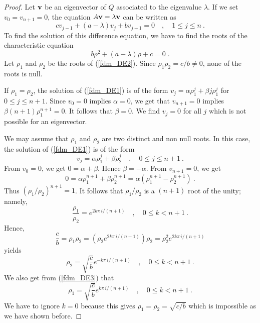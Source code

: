 \begin{proof}
Let $\mathbf{v}$ be an eigenvector of $Q$ associated to the eigenvalue
$\lambda$.  If we set $v_0 = v_{n+1} = 0$, the equation
$A\mathbf{v} = \lambda \mathbf{v}$ can be written as
\begin{equation} \label{fdm_DE1}
c v_{j-1} + (a-\lambda) v_j + b v_{j+1} = 0 \quad ,
\quad 1 \leq j \leq n \ .
\end{equation}
To find the solution of this difference equation, we have to find the
roots of the characteristic equation
\begin{equation} \label{fdm_DE2}
b \rho^2 + (a-\lambda) \rho + c = 0 \; .
\end{equation}
Let $\rho_1$ and $\rho_2$ be the roots of (\ref{fdm_DE2}).
Since $\rho_1\rho_2 = c/b \neq 0$, none of the roots is null.

If $\rho_1 = \rho_2$, the solution of (\ref{fdm_DE1}) is of the form 
$\displaystyle v_j = \alpha \rho_1^j + \beta j \rho_1^j$ for
$0 \leq j \leq n+1$. Since $v_0 = 0$ implies $\alpha=0$, we get that
$v_{n+1} = 0$ implies $\beta (n+1) \rho_1^{n+1} = 0$.  It follows that
$\beta=0$.  We find $v_j=0$ for all $j$ which is not possible for an
eigenvector.

We may assume that $\rho_1$ and $\rho_2$ are two distinct and non null
roots.  In this case, the solution of (\ref{fdm_DE1}) is of the form
\begin{equation} \label{fdm_DE4}
v_j = \alpha \rho_1^j + \beta \rho_2^j \quad , \quad 0 \leq j \leq n+1 \ . 
\end{equation}
From $v_0=0$, we get $0=\alpha+\beta$.  Hence $\beta=-\alpha$.  From
$v_{n+1} = 0$, we get
\[
0 = \alpha \rho_1^{n+1} + \beta \rho_2^{n+1}
= \alpha \left( \rho_1^{n+1} -\rho_2^{n+1}\right) \ .
\]
Thus $\displaystyle \left(\rho_1/\rho_2\right)^{n+1} = 1$.
It follows that $\rho_1/\rho_2$ is a $(n+1)$ root of the unity;
namely,
\begin{equation} \label{fdm_DE3}
\frac{\rho_1}{\rho_2} = e^{2k\pi\,i/(n+1)} \quad ,
\quad 0 \leq k < n+1 \ .
\end{equation}
Hence,
\[
\frac{c}{b} = \rho_1\rho_2 = \left(\rho_2 e^{2k\pi\,i/(n+1)}\right)
\rho_2 = \rho_2^2 e^{2k\pi\,i/(n+1)}
\]
yields
\[
\rho_2 =  \sqrt{\frac{c}{b}} e^{-k\pi\,i/(n+1)} \quad ,
\quad 0 \leq k < n+1 \ .
\]
We also get from (\ref{fdm_DE3}) that
\[
\rho_1 =  \sqrt{\frac{c}{b}} e^{k\pi\,i/(n+1)} \quad ,
\quad 0 \leq k < n+1 \ .
\]
We have to ignore $k=0$ because this gives
$\rho_1 = \rho_2 = \sqrt{c/b}$ which is impossible as we have shown before.


\end{proof}
